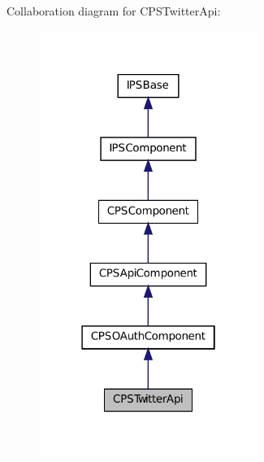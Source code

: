 Collaboration diagram for CPSTwitterApi:\nopagebreak
\begin{figure}[H]
\begin{center}
\leavevmode
\includegraphics[width=202pt]{classCPSTwitterApi__coll__graph}
\end{center}
\end{figure}
